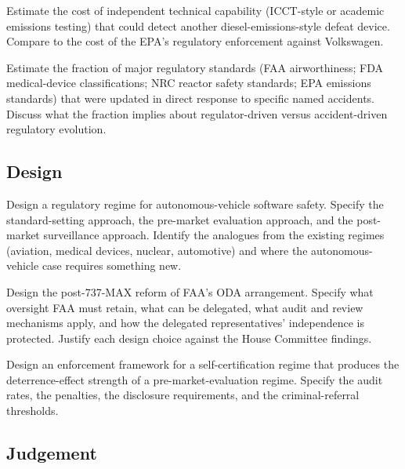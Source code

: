 \begin{exercise}
Estimate the cost of independent technical capability (ICCT-style or academic emissions testing) that could detect another diesel-emissions-style defeat device. Compare to the cost of the EPA's regulatory enforcement against Volkswagen.
\end{exercise}

\begin{exercise}
Estimate the fraction of major regulatory standards (FAA airworthiness; FDA medical-device classifications; NRC reactor safety standards; EPA emissions standards) that were updated in direct response to specific named accidents. Discuss what the fraction implies about regulator-driven versus accident-driven regulatory evolution.
\end{exercise}

\subsection*{Design}

\begin{exercise}
Design a regulatory regime for autonomous-vehicle software safety. Specify the standard-setting approach, the pre-market evaluation approach, and the post-market surveillance approach. Identify the analogues from the existing regimes (aviation, medical devices, nuclear, automotive) and where the autonomous-vehicle case requires something new.
\end{exercise}

\begin{exercise}
Design the post-737-MAX reform of FAA's ODA arrangement. Specify what oversight FAA must retain, what can be delegated, what audit and review mechanisms apply, and how the delegated representatives' independence is protected. Justify each design choice against the House Committee findings.
\end{exercise}

\begin{exercise}
Design an enforcement framework for a self-certification regime that produces the deterrence-effect strength of a pre-market-evaluation regime. Specify the audit rates, the penalties, the disclosure requirements, and the criminal-referral thresholds.
\end{exercise}

\subsection*{Judgement}

